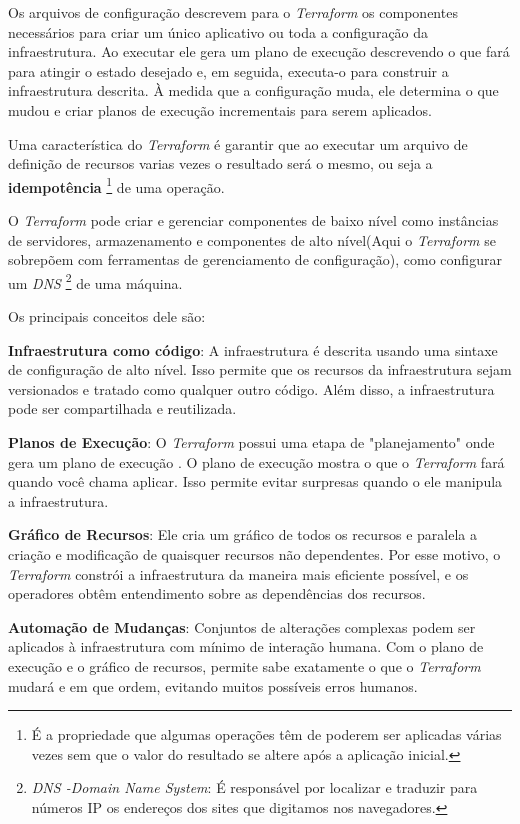 Os arquivos de configuração descrevem para o \textit{Terraform} os componentes necessários para criar um único aplicativo ou toda a configuração da infraestrutura. Ao executar ele gera um plano de execução descrevendo o que fará para atingir o estado desejado e, em seguida, executa-o para construir a infraestrutura descrita. 
À medida que a configuração muda, ele determina o que mudou e criar planos de execução incrementais para serem aplicados.

Uma característica do \textit{Terraform} é garantir que ao executar um arquivo de definição de recursos varias vezes o resultado será o mesmo, ou seja a \textbf{idempotência} \footnote{É a propriedade que algumas operações têm de poderem ser aplicadas várias vezes sem que o valor do resultado se altere após a aplicação inicial.} de uma operação.

O \textit{Terraform} pode criar e gerenciar componentes de baixo nível como instâncias de servidores, armazenamento e componentes de alto nível(Aqui o \textit{Terraform} se sobrepõem com ferramentas de gerenciamento de configuração), como configurar um \textit{DNS} \footnote{\textit{DNS -Domain Name System}: É responsável por localizar e traduzir para números IP os endereços dos sites que digitamos nos navegadores.} de uma máquina.

Os principais conceitos dele são:

\textbf{Infraestrutura como código}: A infraestrutura é descrita usando uma sintaxe de configuração de alto nível. Isso permite que os recursos da infraestrutura sejam versionados e tratado como qualquer outro código. Além disso, a infraestrutura pode ser compartilhada e reutilizada.

\textbf{Planos de Execução}: O \textit{Terraform} possui uma etapa de "planejamento" onde gera um plano de execução . O plano de execução mostra o que o \textit{Terraform} fará quando você chama aplicar. Isso permite evitar surpresas quando o ele manipula a infraestrutura.

\textbf{Gráfico de Recursos}: Ele cria um gráfico de todos os recursos e paralela a criação e modificação de quaisquer recursos não dependentes. Por esse motivo, o \textit{Terraform} constrói a infraestrutura da maneira mais eficiente possível, e os operadores obtêm entendimento sobre as dependências dos recursos.

\textbf{Automação de Mudanças}: Conjuntos de alterações complexas podem ser aplicados à infraestrutura com mínimo de interação humana. Com o plano de execução e o gráfico de recursos, permite sabe exatamente o que o \textit{Terraform} mudará e em que ordem, evitando muitos possíveis erros humanos.

